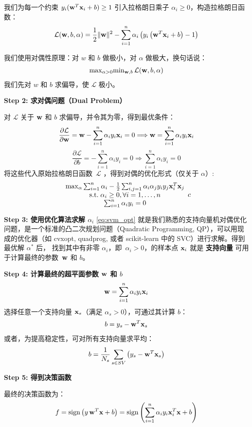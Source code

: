 我们为每一个约束 $y_i({\bf w}^T  {\bf x}_i + b ) \geq 1$ 引入拉格朗日乘子 $\alpha_i \geq 0$，构造拉格朗日函数：
$$
\mathcal{L}({\bf w}, b,\alpha) =  \frac{1}{2} \|{\bf w}\|^2 -\sum_{i=1}^n \alpha_i \left(  y_i \left( {\bf w}^T {\bf x}_i +b\right)-1\right)
$$

我们使用对偶性原理：对 $w$ 和 $b$ 做极小，对 $\alpha$ 做极大，换句话说：
$$
{\rm max}_{\alpha >0} {\rm min}_{{\bf w}, b}\, \mathcal{L}({\bf w}, b, \alpha)
$$
我们先对 $w$ 和 $b$ 求偏导，使 $\mathcal{L}$ 极小。

\textbf{Step 2: 求对偶问题（Dual Problem）}

对 $\mathcal{L}$ 关于 ${\bf w}$ 和 $b$ 求偏导，并令其为零，得到最优条件：
$$
\frac{\partial\mathcal{L}}{\partial {\bf w}}= {\bf w}- \sum_{i=1}^n \alpha_i y_i {\bf x}_i
= 0 \Longrightarrow {\bf w}= \sum_{i=1}^n \alpha_i y_i {\bf x}_i
$$
$$
\frac{\partial\mathcal{L}}{\partial b}=- \sum_{i=1}^n \alpha_i y_i  = 0 \Longrightarrow  \sum_{i=1}^n \alpha_i y_i =0
$$
将这些代入原始拉格朗日函数~$\mathcal{L}$ ，得到对偶的优化形式（仅关于 $\alpha$）:
\begin{equation}\label{eq:svm_opt}
\begin{array}{c}
{\rm max}_{\alpha} \sum_{i=1}^n \alpha_i -\frac{1}{2} \sum_{i,j=1}^n \alpha_i \alpha_j y_i y_j {\bf x}_i^T {\bf x}_j \\
{\rm s.t.} \; \alpha_i \ge 0, \forall i=1, \dots, n \\
  \sum_{i=1}^n \alpha_i y_i =0
  \end{array}{c}
\end{equation}

\textbf{Step 3: 使用优化算法求解 $\alpha_i$}
\eqref{eq:svm_opt} 就是我们熟悉的支持向量机对偶优化问题，是一个标准的凸二次规划问题（Quadratic Programming, QP），可以用现成的优化器（如 cvxopt, quadprog, 或者 scikit-learn 中的 SVC）进行求解。得到最优解 $\alpha^\ast$ 后， 找到其中有非零 $\alpha_i$，即~$\alpha_i>0$，的样本点 ${\bf x}_i$ 就是 \textbf{支持向量}
可用于计算最终的参数~${\bf w}$ 和 $b$。 

\textbf{Step 4: 计算最终的超平面参数 ${\bf w}$ 和 $b$}
$$
{\bf w}= \sum_{i=1}^n \alpha_i y_i {\bf x}_i
$$
选择任意一个支持向量 ${\bf x}_s$（满足 $\alpha_s > 0$），可通过其计算 $b$：
$$
b= y_s -{\bf w}^T {\bf x}_s
$$
或者，为提高稳定性，可对所有支持向量求平均：
$$
b= \frac{1}{N_s} \sum_{s\in SV} \left( y_s - {\bf w}^T {\bf x}_s\right)
$$

\textbf{Step 5: 得到决策函数}

最终的决策函数为：
$$
f= {\rm sign}\left( y\, {\bf w}^T {\bf x} +b\right)= {\rm sign}\left(\sum_{i=1}^n \alpha_i y_i {\bf x}_i^T {\bf x} +b\right)
$$


